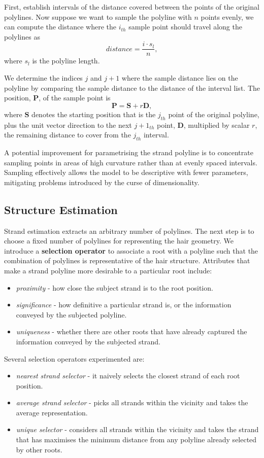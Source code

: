 \documentclass[ %
author={Dillon Keith Diep},
supervisor={Dr. Carl Henrik Ek},
degree={MEng},
title={ART-CG Hair:},
subtitle={Assisted Real-time Content Generation of Stylised Virtual Hair},
type={Research},
year={2017} ]{dissertation}
\begin{document}
	First, establish intervals of the distance covered between the points of the original polylines. Now suppose we want to sample the polyline with $n$ points evenly, we can compute the distance where the $i_{th}$ sample point should travel along the polylines as
	$$distance=\frac{i \cdot s_l}{n},$$
	where $s_l$ is the polyline length.
	
	We determine the indices $j$ and $j+1$ where the sample distance lies on the polyline by comparing the sample distance to the distance of the interval list. The position, $\bm{P}$, of the sample point is
	$$\bm{P} = \bm{S} + r\bm{D},$$
	where $\bm{S}$ denotes the starting position that is the $j_{th}$ point of the original polyline, plus the unit vector direction to the next $j+1_{th}$ point, $\bm{D}$, multiplied by scalar $r$, the remaining distance to cover from the $j_{th}$ interval.
	
	A potential improvement for parametrising the strand polyline is to concentrate sampling points in areas of high curvature rather than at evenly spaced intervals. Sampling effectively allows the model to be descriptive with fewer parameters, mitigating problems introduced by the curse of dimensionality.
	
	\subsection{Structure Estimation}
	Strand estimation extracts an arbitrary number of polylines. The next step is to choose a fixed number of polylines for representing the hair geometry. We introduce a \textbf{selection operator} to associate a root with a polyline such that the combination of polylines is representative of the hair structure. Attributes that make a strand polyline more desirable to a particular root include:
	\begin{itemize}
		\item \textit{proximity} - how close the subject strand is to the root position.
		\item \textit{significance} - how definitive a particular strand is, or the information conveyed by the subjected polyline.
		\item \textit{uniqueness} - whether there are other roots that have already captured the information conveyed by the subjected strand.
	\end{itemize}
	Several selection operators experimented are:
	\begin{itemize}
		\item \textit{nearest strand selector} - it naively selects the closest strand of each root position. 
		\item \textit{average strand selector} - picks all strands within the vicinity and takes the average representation.
		\item \textit{unique selector} - considers all strands within the vicinity and takes the strand that has maximises the minimum distance from any polyline already selected by other roots.
	\end{itemize}
	
\end{document}
